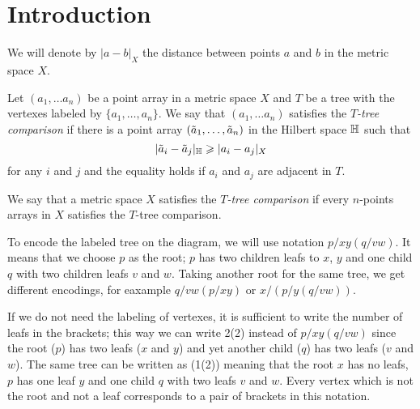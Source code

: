 \section{Introduction}\label{sec:intro}

We will denote by $|a-b|_X$ the distance between points $a$ and $b$ in the metric space $X$.

Let $(a_1,\dots a_n)$ be a point array in a metric space $X$ and $T$ be a 
tree with the vertexes labeled by $\{a_1,\dots,a_n\}$.
We say that $(a_1,\dots a_n)$  satisfies the \emph{$T$-tree comparison} if there is a point array $(\~a_1,\dots, \~a_n)$ in the Hilbert space $\HH$ such that 
\[|\~a_i-\~a_j|_\HH\ge|a_i-a_j|_X\]
for any $i$ and $j$ and the equality holds if $a_i$ and $a_j$ are adjacent in $T$.

We say that a metric space $X$ satisfies the \emph{$T$-tree comparison} if 
every $n$-points arrays in $X$ satisfies the $T$-tree comparison.

\hide
\begin{wrapfigure}{r}{27 mm}
\end{wrapfigure}
\unhide

To encode the labeled tree on the diagram, we will use notation $p/xy(q/vw)$.
It means that we choose $p$ as the root; 
$p$ has two children leafs to $x$, $y$ and one child $q$ with two children leafs $v$ and $w$.
Taking another root for the same tree, we get different encodings, for eaxample $q/vw(p/xy)$ or $x/(p/y(q/vw))$.

If we do not need the labeling of vertexes,
it is sufficient to write the number of leafs in the brackets;
this way we can write 2(2) instead of $p/xy(q/vw)$ since the root ($p$) has two leafs ($x$ and $y$) and yet another child ($q$) has two leafs ($v$ and $w$).  
The same tree can be written as (1(2)) meaning that the root $x$ has no leafs, $p$ has one leaf $y$ and one child $q$ with two leafs $v$ and $w$.
Every vertex which is not the root and not a leaf corresponds to a pair of brackets in this notation.

